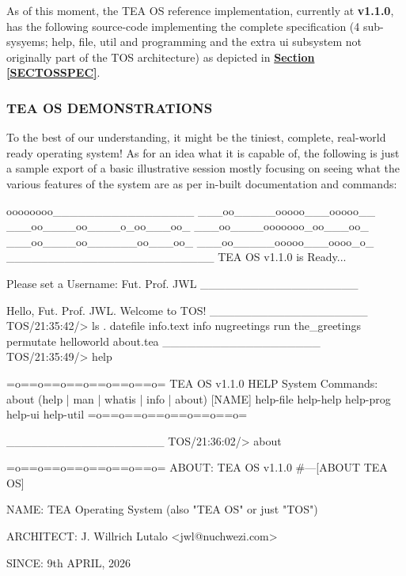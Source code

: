 \documentclass[a4paper, 18pt]{book} %
\begin{document}
{{{As of this moment, the TEA OS reference implementation, currently at \textbf{v1.1.0}, has the following source-code implementing the complete specification (4 sub-sysyems; help, file, util and programming and the extra ui subsystem not originally part of the TOS architecture) as depicted in \textbf{\hyperref[SECTOSSPEC]{Section \ref{SECTOSSPEC}}}.





\vspace{2em}

\subsubsection{TEA OS DEMONSTRATIONS}

To the best of our understanding, it might be the tiniest, complete, real-world ready operating system! As for an idea what it is capable of, the following is just a sample export of a basic illustrative session mostly focusing on seeing what the various features of the system are as per in-built documentation and commands:


  \vspace{2em}
 \begin{tcbverbatim}[title=Sample OUTPUT 1 from TEA OS v1.1.0]

oooooooo_________________
___oo_____ooooo___ooooo__
___oo____oo____o_oo___oo_
___oo____ooooooo_oo___oo_
___oo____oo______oo___oo_
___oo_____ooooo___oooo_o_
_________________________
TEA OS v1.1.0 is Ready...

Please set a Username:
Fut. Prof. JWL
___________________

Hello, Fut. Prof. JWL. Welcome to TOS! 
___________________
TOS/21:35:42/> 
ls
.
datefile
info.text
info
nugreetings
run
the_greetings
permutate
helloworld
about.tea
___________________
TOS/21:35:49/> 
help

=o==o==o==o==o==o==o=
TEA OS v1.1.0 HELP System Commands:
about
(help | man | whatis | info | about) [NAME]
help-file
help-help
help-prog
help-ui
help-util
=o==o==o==o==o==o==o=

___________________
TOS/21:36:02/> 
about

=o==o==o==o==o==o==o=
ABOUT: TEA OS v1.1.0 
#---[ABOUT TEA OS]

NAME: TEA Operating System 
(also "TEA OS" or just "TOS")

ARCHITECT: J. Willrich Lutalo <jwl@nuchwezi.com>

SINCE: 9th APRIL, 2026


\end{tcbverbatim}}}}
\end{document}
